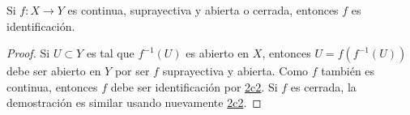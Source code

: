 
\begin{proposition}
Si $f : X \longrightarrow Y$ es continua, suprayectiva y abierta o cerrada, entonces $f$ es identificación.
\end{proposition}

\begin{proof}
Si $U \subset Y$ es tal que $f^{-1}(U)$ es abierto en $X$, entonces $U = f(f^{-1}(U))$ debe ser abierto en $Y$ por ser $f$ suprayectiva y abierta. Como $f$ también es continua, entonces $f$ debe ser identificación por \hyperref[card:2c2]{\textsf{2c2}}. Si $f$ es cerrada, la demostración es similar usando nuevamente \hyperref[card:2c2]{\textsf{2c2}}.

\end{proof}
